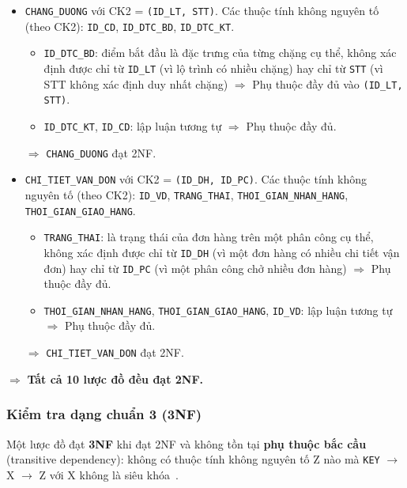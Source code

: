 \documentclass[11pt]{report}
\begin{document}
\begin{itemize}
    \item \texttt{CHANG\_DUONG} với CK2 = \texttt{(ID\_LT, STT)}. Các thuộc tính không nguyên tố (theo CK2): \texttt{ID\_CD}, \texttt{ID\_DTC\_BD}, \texttt{ID\_DTC\_KT}.
    \begin{itemize}
        \item \texttt{ID\_DTC\_BD}: điểm bắt đầu là đặc trưng của từng chặng cụ thể, không xác định được chỉ từ \texttt{ID\_LT} (vì lộ trình có nhiều chặng) hay chỉ từ \texttt{STT} (vì STT không xác định duy nhất chặng) $\Rightarrow$ Phụ thuộc đầy đủ vào \texttt{(ID\_LT, STT)}.
        
        \item \texttt{ID\_DTC\_KT}, \texttt{ID\_CD}: lập luận tương tự $\Rightarrow$ Phụ thuộc đầy đủ.
    \end{itemize}
    $\Rightarrow$ \texttt{CHANG\_DUONG} đạt 2NF.

    \item \texttt{CHI\_TIET\_VAN\_DON} với CK2 = \texttt{(ID\_DH, ID\_PC)}. Các thuộc tính không nguyên tố (theo CK2): \texttt{ID\_VD}, \texttt{TRANG\_THAI}, \texttt{THOI\_GIAN\_NHAN\_HANG}, \texttt{THOI\_GIAN\_GIAO\_HANG}.
    \begin{itemize}
        \item \texttt{TRANG\_THAI}: là trạng thái của đơn hàng trên một phân công cụ thể, không xác định được chỉ từ \texttt{ID\_DH} (vì một đơn hàng có nhiều chi tiết vận đơn) hay chỉ từ \texttt{ID\_PC} (vì một phân công chở nhiều đơn hàng) $\Rightarrow$ Phụ thuộc đầy đủ.
        
        \item \texttt{THOI\_GIAN\_NHAN\_HANG}, \texttt{THOI\_GIAN\_GIAO\_HANG}, \texttt{ID\_VD}: lập luận tương tự $\Rightarrow$ Phụ thuộc đầy đủ.
    \end{itemize}
    $\Rightarrow$ \texttt{CHI\_TIET\_VAN\_DON} đạt 2NF.
\end{itemize}
$\Rightarrow$ \textbf{Tất cả 10 lược đồ đều đạt 2NF.}

\subsubsection{Kiểm tra dạng chuẩn 3 (3NF)}

Một lược đồ đạt \textbf{3NF} khi đạt 2NF và không tồn tại \textbf{phụ thuộc bắc cầu} (transitive dependency): không có thuộc tính không nguyên tố Z nào mà \texttt{KEY} $\to$ X $\to$ Z với X không là siêu khóa~\cite{elmasri2015fundamentals}.
\end{document}
